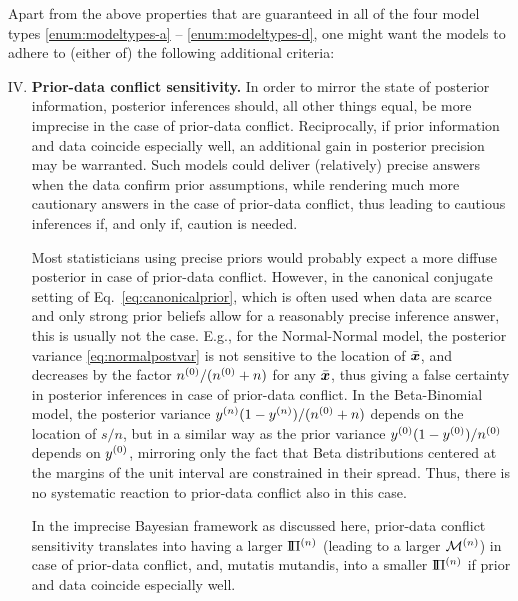 Apart from the above properties that are guaranteed in all of the four model types %
\eqref{enum:modeltypes-a} -- \eqref{enum:modeltypes-d},
one might want the models to adhere to (either of) the following additional criteria:
\begin{enumerate}[I.]
\setcounter{enumi}{3}
\item \textbf{Prior-data conflict sensitivity.}\label{enum:pdc}
In order to mirror the state of posterior information,
posterior inferences should, all other things equal, be more imprecise in the case of prior-data conflict.
Reciprocally, if prior information and data coincide especially well, an additional gain in posterior precision may be warranted.
Such models could deliver (relatively) precise answers when the data confirm prior assumptions,
while rendering much more cautionary answers in the case of prior-data conflict,
thus leading to cautious inferences if, and only if, caution is needed.

Most statisticians using precise priors would probably expect a more diffuse posterior in case of prior-data conflict.
However, in the canonical conjugate setting of Eq.~\eqref{eq:canonicalprior},
which is often used when data are scarce and only strong prior beliefs allow for a reasonably precise inference answer,
this is usually not the case.
E.g., for the Normal-Normal model, the posterior variance \eqref{eq:normalpostvar} is not sensitive to the location of $\bar{{\bm x}}$,
and decreases by the factor $n^{(0)}/(n^{(0)}+n)$ for any $\bar{{\bm x}}$,
thus giving a false certainty in posterior inferences in case of prior-data conflict.
In the Beta-Binomial model, the posterior variance $y^{(n)} (1-y^{(n)})/(n^{(0)} + n)$ depends on the location of $s/n$,
but in a similar way as the prior variance $y^{(0)} (1-y^{(0)})/n^{(0)}$ depends on $y^{(0)}$,
mirroring only the fact that Beta distributions centered at the margins of the unit interval are constrained in their spread.
Thus, there is no systematic reaction to prior-data conflict also in this case.

In the imprecise Bayesian framework as discussed here,
prior-data conflict sensitivity translates into having a larger $\text{I}\!\Pi^{(n)}$ (leading to a larger $\mathcal{M}^{(n)}$) in case of prior-data conflict,
and, mutatis mutandis, into a smaller $\text{I}\!\Pi^{(n)}$ if prior and data coincide especially well.


\end{enumerate}
